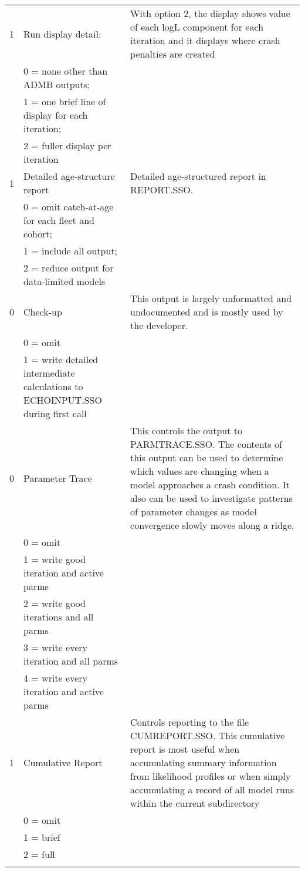 \begin{landscape}
\begin{longtable}{p{3cm} p{7cm} p{11cm}}
 \hline
 1 & Run display detail: &  \multirow{1}{1cm}[-0.1cm]{\parbox{11cm}{With option 2, the display shows value of each logL component for each iteration and it displays where crash penalties are created}} \\
   & 0 = none other than ADMB outputs; & \\
   & 1 = one brief line of display for each iteration; & \\
   & 2 = fuller display per iteration & \\
		  
 \hline
 1 & Detailed age-structure report & \multirow{1}{1cm}[-0.1cm]{\parbox{11cm}{Detailed age-structured report in REPORT.SSO.}} \\
   & 0 = omit catch-at-age for each fleet and cohort; & \\
   & 1 = include all output; &  \\
   & 2 = reduce output for data-limited models &  \\		 
		 
 \hline
 0 & Check-up & \multirow{1}{1cm}[-0.1cm]{\parbox{11cm}{This output is largely unformatted and undocumented and is mostly used by the developer. }}\\
   & 0 = omit & \\
   & 1 = write detailed intermediate calculations to ECHOINPUT.SSO during first call & \\

 \pagebreak		
 0 & Parameter Trace & \multirow{1}{1cm}[-0.1cm]{\parbox{11cm}{This controls the output to PARMTRACE.SSO. The contents of this output can be used to determine which values are changing when a model approaches a crash condition.  It also can be used to investigate patterns of parameter changes as model convergence slowly moves along a ridge.}} \\
   & 0 = omit & \\
   & 1 = write good iteration and active parms & \\
   & 2 = write good iterations and all parms & \\
   & 3 = write every iteration and all parms & \\
   & 4 = write every iteration and active parms &  \\
   
 \hline
 1 & Cumulative Report & \multirow{1}{1cm}[-0.1cm]{\parbox{11cm}{Controls reporting to the file CUMREPORT.SSO.
 		This cumulative report is most useful when accumulating summary information from likelihood profiles or when simply accumulating a record of all model runs within the current subdirectory}}\\
   & 0 = omit  & \\
   & 1 = brief & \\
   & 2 = full  &  \\
   & & \\
	 

\end{longtable}
\end{landscape}

